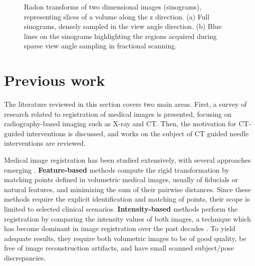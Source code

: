 \begin{figure}[t]
  \centering
  \hfill
  \caption{\small{Radon transforms of two dimensional images (sinograms), representing slices of a volume along the z direction. (a) Full sinograms, densely sampled in the view angle direction. (b) Blue lines on the sinograms highlighting the regions acquired during sparse view angle sampling in fractional scanning.}}
    \label{fig:figures/fractional}
\end{figure}

\section{Previous work}

The literature reviewed in this section covers two main areas. First, a survey of research related to registration of medical images is presented, focusing on radiography-based imaging such as X-ray and CT. Then, the motivation for CT-guided interventions is discussed, and works on the subject of CT guided needle interventions are reviewed.

Medical image registration has been studied extensively, with several approaches emerging \cite{maintz1998survey}.
\textbf{Feature-based} methods compute the rigid transformation by matching points defined in volumetric medical images, usually of fiducials or natural features, and minimizing the sum of their pairwise distances. Since these methods require the explicit identification and matching of points, their scope is limited to selected clinical scenarios. 
\textbf{Intensity-based} methods perform the registration by comparing the intensity values of both images, a technique which has become dominant in image registration over the past decades \cite{viergever2016survey}. To yield adequate results, they require both volumetric images to be of good quality, be free of image reconstruction artifacts, and have small scanned subject/pose discrepancies.

